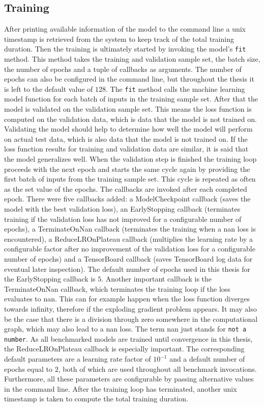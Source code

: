 \documentclass[draft,final]{vutinfth} %
\begin{document}
    \subsection{Training}
    After printing available information of the model to the command line a unix timestamp is retrieved from the system to keep track of the total training duration.
    Then the training is ultimately started by invoking the model's \texttt{fit} method. This method takes the training and validation sample set, the batch size, the number of epochs and a tuple of callbacks as arguments.
    The number of epochs can also be configured in the command line, but throughout the thesis it is left to the default value of $128$.
    The \texttt{fit} method calls the machine learning model function for each batch of inputs in the training sample set. After that the model is validated on the validation sample set.
    This means the loss function is computed on the validation data, which is data that the model is not trained on.
    Validating the model should help to determine how well the model will perform on actual test data, which is also data that the model is not trained on. 
    If the loss function results for training and validation data are similar, it is said that the model generalizes well.
    When the validation step is finished the training loop proceeds with the next epoch and starts the same cycle again by providing the first batch of inputs from the training sample set.
    This cycle is repeated as often as the set value of the epochs.
    The callbacks are invoked after each completed epoch. There were five callbacks added: a ModelCheckpoint callback (saves the model with the best validation loss), an EarlyStopping callback (terminates training if the validation loss has not improved for a configurable number of epochs), a TerminateOnNan callback (terminates the training when a nan loss is encountered), a ReduceLROnPlateau callback (multiplies the learning rate by a configurable factor after no improvement of the validation loss for a configurable number of epochs) and a TensorBoard callback (saves TensorBoard log data for eventual later inspection).
    The default number of epochs used in this thesis for the EarlyStopping callback is $5$.
    Another important callback is the TerminateOnNan callback, which terminates the training loop if the loss evaluates to nan.
    This can for example happen when the loss function diverges towards infinity, therefore if the exploding gradient problem appears. 
    It may also be the case that there is a division through zero somewhere in the computational graph, which may also lead to a nan loss.
    The term nan just stands for \texttt{not a number}.
    As all benchmarked models are trained until convergence in this thesis, the ReduceLROnPlateau callback is especially important.
    The corresponding default parameters are a learning rate factor of $10^{-1}$ and a default number of epochs equal to $2$, both of which are used throughout all benchmark invocations.
    Furthermore, all these parameters are configurable by passing alternative values in the command line.
    After the training loop has terminated, another unix timestamp is taken to compute the total training duration.
\end{document}
